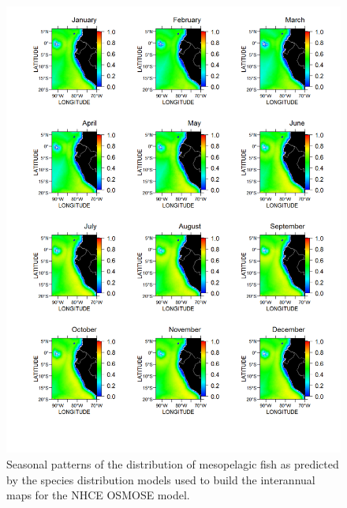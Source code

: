 \begin{figure}
\centering
\includegraphics[height=0.8\textheight]{figures/meso-climatology}
\caption[Seasonal patterns of the distribution of mesopelagic fish]{Seasonal patterns of the distribution of mesopelagic fish as predicted by the species distribution models used to build the interannual maps for the NHCE OSMOSE model.}
\label{fig:meso-climatology}
\end{figure}

